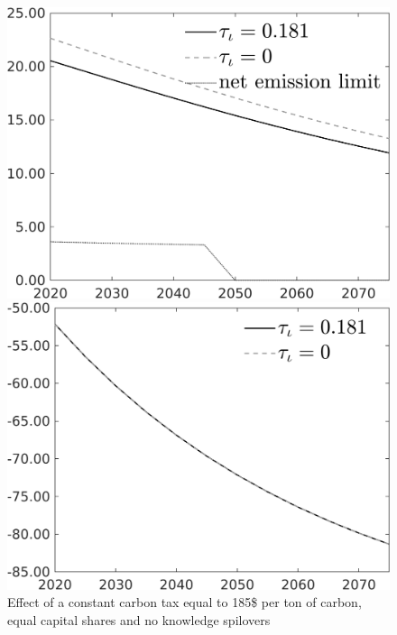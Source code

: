 \begin{figure}[h!!]
	\centering
	\caption{Effect of a constant carbon tax equal to 185\$ per ton of carbon, equal capital shares and no knowledge spilovers }\label{fig:Leveltauf_nsk0_xgr0_equal_noknow}		
	\begin{minipage}[]{0.32\textwidth}
		\includegraphics[width=1\textwidth]{../../codding_model/own_basedOnFried/optimalPol_010922_revision/figures/all_13Sept22/CompTauf_bytaul_Equlab_Reg0_Emnet_spillover0_nsk0_xgr0_knspil1_sep0_LFlimit0_emsbase0_countec0_GovRev0_etaa0.79_lgd1.png}
	\end{minipage}	
	\begin{minipage}[]{0.32\textwidth}
		\includegraphics[width=1\textwidth]{../../codding_model/own_basedOnFried/optimalPol_010922_revision/figures/all_13Sept22/PerdifNoTauf_Equlab_regime0_CompTaul_F_spillover0_nsk0_xgr0_knspil1_sep0_LFlimit0_emsbase0_countec0_GovRev0_etaa0.79_lgd1.png}

\end{minipage}
\end{figure}

